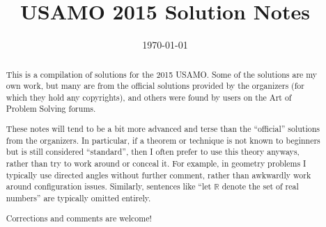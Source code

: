\documentclass[11pt]{scrartcl}
\title{USAMO 2015 Solution Notes}
\date{\today}
\begin{document}
\maketitle

\begin{abstract}
This is a compilation of solutions
for the 2015 USAMO.
Some of the solutions are my own work,
but many are from the official solutions provided by the organizers
(for which they hold any copyrights),
and others were found by users on the Art of Problem Solving forums.

These notes will tend to be a bit more advanced and terse than the ``official''
solutions from the organizers.
In particular, if a theorem or technique is not known to beginners
but is still considered ``standard'', then I often prefer to
use this theory anyways, rather than try to work around or conceal it.
For example, in geometry problems I typically use directed angles
without further comment, rather than awkwardly work around configuration issues.
Similarly, sentences like ``let $\mathbb{R}$ denote the set of real numbers''
are typically omitted entirely.

Corrections and comments are welcome!
\end{abstract}

\tableofcontents
\newpage

\addtocounter{section}{-1}
\end{document}
